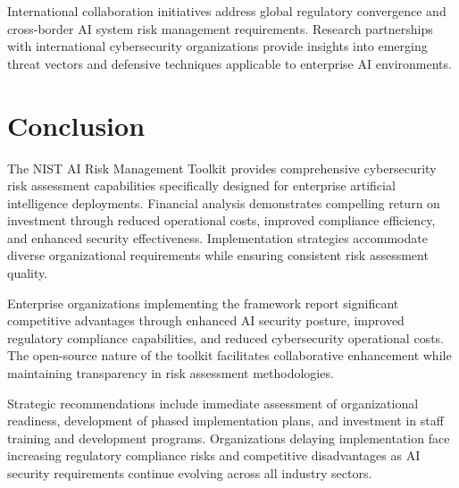 \documentclass[11pt,letterpaper]{article}
\begin{document}
International collaboration initiatives address global regulatory convergence and cross-border AI system risk management requirements. Research partnerships with international cybersecurity organizations provide insights into emerging threat vectors and defensive techniques applicable to enterprise AI environments.

\section{Conclusion}

The NIST AI Risk Management Toolkit provides comprehensive cybersecurity risk assessment capabilities specifically designed for enterprise artificial intelligence deployments. Financial analysis demonstrates compelling return on investment through reduced operational costs, improved compliance efficiency, and enhanced security effectiveness. Implementation strategies accommodate diverse organizational requirements while ensuring consistent risk assessment quality.

Enterprise organizations implementing the framework report significant competitive advantages through enhanced AI security posture, improved regulatory compliance capabilities, and reduced cybersecurity operational costs. The open-source nature of the toolkit facilitates collaborative enhancement while maintaining transparency in risk assessment methodologies.

Strategic recommendations include immediate assessment of organizational readiness, development of phased implementation plans, and investment in staff training and development programs. Organizations delaying implementation face increasing regulatory compliance risks and competitive disadvantages as AI security requirements continue evolving across all industry sectors.
\end{document}
